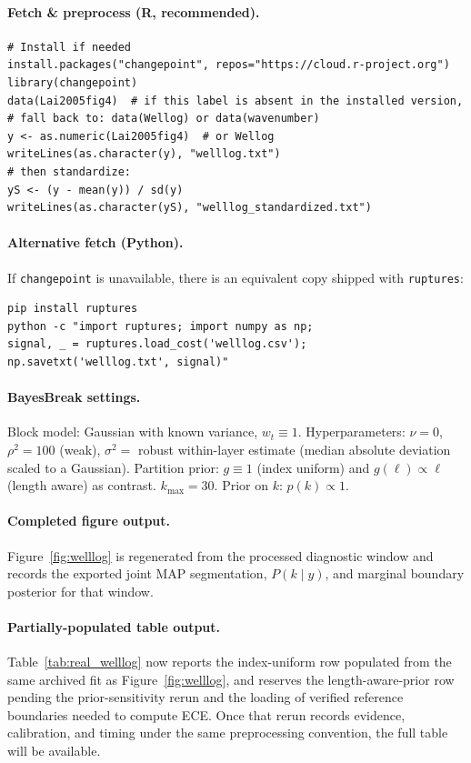 \paragraph{Fetch \& preprocess (R, recommended).}
\begin{verbatim}
# Install if needed
install.packages("changepoint", repos="https://cloud.r-project.org")
library(changepoint)
data(Lai2005fig4)  # if this label is absent in the installed version,
# fall back to: data(Wellog) or data(wavenumber)
y <- as.numeric(Lai2005fig4)  # or Wellog
writeLines(as.character(y), "welllog.txt")
# then standardize:
yS <- (y - mean(y)) / sd(y)
writeLines(as.character(yS), "welllog_standardized.txt")
\end{verbatim}

\paragraph{Alternative fetch (Python).}
If \texttt{changepoint} is unavailable, there is an equivalent copy shipped with \texttt{ruptures}:
\begin{verbatim}
pip install ruptures
python -c "import ruptures; import numpy as np;
signal, _ = ruptures.load_cost('welllog.csv');
np.savetxt('welllog.txt', signal)"
\end{verbatim}

\paragraph{BayesBreak settings.}
Block model: Gaussian with known variance, $w_t\equiv 1$. Hyperparameters: $\nu=0$,
$\rho^2=100$ (weak), $\sigma^2=$ robust within-layer estimate (median absolute deviation scaled to
a Gaussian). Partition prior: $g\equiv 1$ (index uniform) and $g(\ell)\propto\ell$ (length
aware) as contrast. $k_{\max}=30$. Prior on $k$: $p(k)\propto 1$.

\paragraph{Completed figure output.}
Figure~\ref{fig:welllog} is regenerated from the processed diagnostic window and records the exported joint MAP segmentation, $P(k\mid y)$, and marginal boundary posterior for that window.

\paragraph{Partially-populated table output.}
Table~\ref{tab:real_welllog} now reports the index-uniform row populated from the same archived fit as Figure~\ref{fig:welllog}, and reserves the length-aware-prior row pending the prior-sensitivity rerun and the loading of verified reference boundaries needed to compute ECE. Once that rerun records evidence, calibration, and timing under the same preprocessing convention, the full table will be available.

